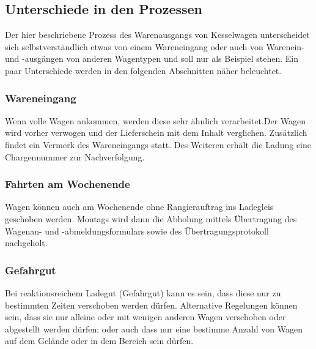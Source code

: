 \subsection{Unterschiede in den Prozessen}
Der hier beschriebene Prozess des Warenausgangs von Kesselwagen unterscheidet sich selbstverständlich etwas von einem Wareneingang oder auch von Warenein- und -ausgängen von anderen Wagentypen und soll nur als Beispiel stehen. Ein paar Unterschiede werden in den folgenden Abschnitten näher beleuchtet.
\subsubsection{Wareneingang}
Wenn volle Wagen ankommen, werden diese sehr ähnlich verarbeitet.Der Wagen wird vorher verwogen und der Lieferschein mit dem Inhalt verglichen. Zusätzlich findet ein Vermerk des Wareneingangs statt. Des Weiteren erhält die Ladung eine Chargennummer zur Nachverfolgung.
\subsubsection{Fahrten am Wochenende}
Wagen können auch am Wochenende ohne Rangierauftrag ins Ladegleis geschoben werden. Montags wird dann die Abholung mittels Übertragung des Wagenan- und -abmeldungsformulars sowie des Übertragungsprotokoll nachgeholt.
\subsubsection{Gefahrgut}
Bei reaktionsreichem Ladegut (Gefahrgut) kann es sein, dass diese nur zu bestimmten Zeiten verschoben werden dürfen. Alternative Regelungen können sein,  dass sie nur alleine oder mit wenigen anderen Wagen verschoben oder abgestellt werden dürfen; oder auch dass nur eine bestimme Anzahl von Wagen auf dem Gelände oder in dem Bereich sein dürfen.
